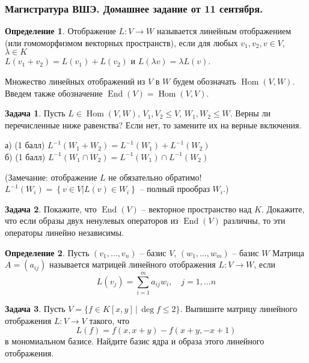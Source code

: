 \documentclass[12pt, fleqn]{extarticle}
\newcommand{\curvedbrackets}[1]{\left\{#1\right\}}
\DeclareMathOperator{\Hom}{Hom}
\DeclareMathOperator{\End}{End}
\theoremstyle{definition}
\newtheorem{definition}{Определение}
\newtheorem{problem}{Задача}
\theoremstyle{remark}
\begin{document}
\clearpage

\thispagestyle{empty}
\subsubsection*{Магистратура ВШЭ. Домашнее задание от 11 сентября.}


\begin{definition}
Отображение $L: V \rightarrow W$ называется линейным отображением
(или гомоморфизмом векторных пространств), если для любых $v_{1}, v_{2}, v \in V$,
$\lambda \in K$\\
$L(v_{1} + v_{2}) = L(v_{1}) + L(v_{2})$ и $L(\lambda v) = \lambda L(v)$.

Множество линейных отображений из $V$ в $W$ будем обозначать $\Hom(V, W)$. 
Введем также обозначение $\End(V) = \Hom(V, V)$.
\end{definition}



\begin{problem} 
Пусть $L \in \Hom(V, W)$, $V_{1}, V_{2} \leqslant V$,
$W_{1}, W_{2} \leqslant W$.
Верны ли перечисленные ниже равенства? 
Если нет, то замените их на верные включения.

а) (1 балл) $L^{-1}(W_{1} + W_{2}) = 
L^{-1}(W_{1}) + L^{-1}(W_{2})$\\
б) (1 балл) $L^{-1}(W_{1} \cap W_{2}) =
 L^{-1}(W_{1}) \cap L^{-1}(W_{2})$
 
(Замечание: отображение $L$ не обязательно обратимо! 
$L^{-1}(W_{i}) = \curvedbrackets{v \in V \vert L(v) \in W_{i}}$ 
-- полный прообраз $W_{i}$.)
\end{problem}

\begin{problem} 
Покажите, что $\End(V)$ -- векторное пространство над $K$.
Докажите, что если образы двух ненулевых операторов из
$\End(V)$ различны, то эти операторы линейно независимы.
\end{problem}


\begin{definition}
Пусть $(v_{1}, \ldots, v_{n})$ -- базис $V$, 
$(w_{1}, \ldots, w_{m})$ -- базис $W$
Матрица $A = (a_{ij})$ называется матрицей линейного отображения 
$L: V \rightarrow W$, если 
$$L(v_{j}) = \sum\limits_{i = 1}^{m} a_{ij}w_{i}, \quad j = 1, \ldots n$$
\end{definition}


\begin{problem}
Пусть $V=\{ f\in K[x,y]\,|\, \deg f\leq 2\}$. 
Выпишите матрицу линейного отображения $L\colon V\to V$ такого, что 
$$L(f)=f(x,x+y)-f(x+y,-x+1)$$  
в мономиальном базисе. Найдите базис ядра и образа этого линейного отображения.
\end{problem}
\end{document}
